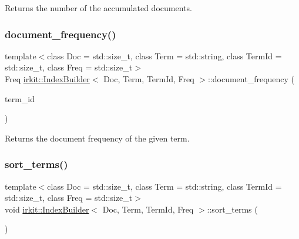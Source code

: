 Returns the number of the accumulated documents. 

\mbox{\label{classirkit_1_1IndexBuilder_ac4c8613d07637de4b67d61df2910bbd0}} 
\subsubsection{\texorpdfstring{document\+\_\+frequency()}{document\_frequency()}}
{\footnotesize\ttfamily template$<$class Doc  = std\+::size\+\_\+t, class Term  = std\+::string, class Term\+Id  = std\+::size\+\_\+t, class Freq  = std\+::size\+\_\+t$>$ \\
Freq \mbox{\hyperlink{classirkit_1_1IndexBuilder}{irkit\+::\+Index\+Builder}}$<$ Doc, Term, Term\+Id, Freq $>$\+::document\+\_\+frequency (\begin{DoxyParamCaption}\item[{Term\+Id}]{term\+\_\+id }\end{DoxyParamCaption})\hspace{0.3cm}{\ttfamily [inline]}}



Returns the document frequency of the given term. 

\mbox{\label{classirkit_1_1IndexBuilder_a242138da460b9853fc6aebb5b8c59c86}} 
\subsubsection{\texorpdfstring{sort\+\_\+terms()}{sort\_terms()}}
{\footnotesize\ttfamily template$<$class Doc  = std\+::size\+\_\+t, class Term  = std\+::string, class Term\+Id  = std\+::size\+\_\+t, class Freq  = std\+::size\+\_\+t$>$ \\
void \mbox{\hyperlink{classirkit_1_1IndexBuilder}{irkit\+::\+Index\+Builder}}$<$ Doc, Term, Term\+Id, Freq $>$\+::sort\+\_\+terms (\begin{DoxyParamCaption}{ }\end{DoxyParamCaption})\hspace{0.3cm}{\ttfamily [inline]}}



